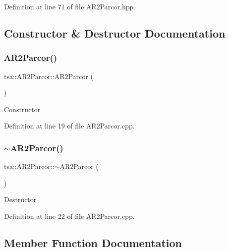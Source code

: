 Definition at line 71 of file A\+R2\+Parcor.\+hpp.



\subsection{Constructor \& Destructor Documentation}
\mbox{\label{classtsa_1_1_a_r2_parcor_af28c0ed978d27202d9f7f5df6464efef}} 
\subsubsection{\texorpdfstring{A\+R2\+Parcor()}{AR2Parcor()}}
{\footnotesize\ttfamily tsa\+::\+A\+R2\+Parcor\+::\+A\+R2\+Parcor (\begin{DoxyParamCaption}{ }\end{DoxyParamCaption})}

Constructor 

Definition at line 19 of file A\+R2\+Parcor.\+cpp.

\mbox{\label{classtsa_1_1_a_r2_parcor_a8aaf9b98dd73626724c6c83bf7e3a5ed}} 
\subsubsection{\texorpdfstring{$\sim$\+A\+R2\+Parcor()}{~AR2Parcor()}}
{\footnotesize\ttfamily tsa\+::\+A\+R2\+Parcor\+::$\sim$\+A\+R2\+Parcor (\begin{DoxyParamCaption}{ }\end{DoxyParamCaption})\hspace{0.3cm}{\ttfamily [virtual]}}

Destructor 

Definition at line 22 of file A\+R2\+Parcor.\+cpp.



\subsection{Member Function Documentation}
\mbox{\label{classtsa_1_1_a_r2_parcor_a238bba748285d03e10622d2f2f0cc108}} 
